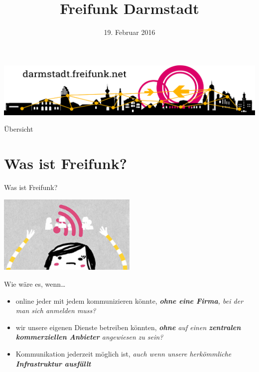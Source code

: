 \documentclass[10pt]{beamer}
\title{Freifunk Darmstadt}
\author{}
\institute[Inst.]{eine Initiative des Chaos Darmstadt e.V.}
\date{\footnotesize 19. Februar 2016}
\begin{document}

  \begin{frame}
    \centering\includegraphics[width=\textwidth]{images/logo-skyline}
    \maketitle
  \end{frame}

  \begin{frame}{Übersicht}
    \tableofcontents
  \end{frame}

  \section{Was ist Freifunk?}
    \begin{frame}{Was ist Freifunk?}
      \begin{center}
        \includegraphics[width=0.5\textwidth]{images/up}
      \end{center}
      Wie wäre es, wenn\ldots
      \begin{itemize}
        \pause
        \item online jeder mit jedem kommunizieren könnte\pause, \textit{\textbf{ohne eine Firma}, bei der man sich anmelden muss?}
        \pause
        \item wir unsere eigenen Dienste betreiben könnten\pause,  \textit{\textbf{ohne} auf einen \textbf{zentralen kommerziellen Anbieter} angewiesen zu sein?}
        \pause
        \item Kommunikation jederzeit möglich ist\pause, \textit{auch wenn unsere herkömmliche \textbf{Infrastruktur ausfällt}}
      \end{itemize}
    \end{frame}
\end{document}
